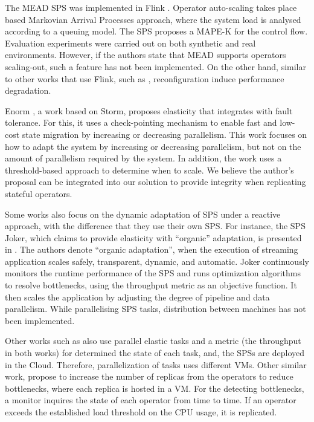 The MEAD SPS \cite{RussoCCP21} was implemented in Flink \cite{CarboneKEMHT15}. Operator auto-scaling takes place based  Markovian Arrival Processes approach, where the system load is analysed according to a queuing model. The SPS proposes a MAPE-K for the control flow. Evaluation experiments were carried out on both synthetic and real environments. However, if the authors state that MEAD supports operators scaling-out, such a feature has not been implemented. On the other hand, similar to other works that use Flink, such as \cite{arkian2021model}, reconfiguration induce performance degradation.

Enorm \citep{MadsenZS16}, a work based on Storm, proposes elasticity that integrates with fault tolerance. For this, it uses a check-pointing mechanism to enable fast and low-cost state migration by increasing or decreasing parallelism. This work focuses on how to adapt the system by increasing or decreasing parallelism, but not on the amount of parallelism required by the system. In addition, the work uses a threshold-based approach to determine when to scale. We believe the author's proposal can be integrated into our solution to provide integrity when replicating stateful operators.

Some works also focus on the dynamic adaptation of SPS under a reactive approach, with the difference that they use their own SPS. For instance, the SPS Joker, which claims to provide elasticity with ``organic'' adaptation, is presented in \cite{KahveciG20}. The authors denote ``organic adaptation'', when the execution of streaming application scales safely, transparent, dynamic, and automatic. Joker continuously monitors the runtime performance of the SPS and runs optimization algorithms to resolve bottlenecks, using the throughput metric as an objective function. It then scales the application by adjusting the degree of pipeline and data parallelism. While parallelising SPS tasks, distribution between machines has not been implemented.

Other works such as \citep{GedikSHW14, SchneiderAGBW09} also use parallel elastic tasks and a metric (the throughput in both works) for determined the state of each task, and, the SPSs are deployed in the {Cloud}. Therefore, parallelization of tasks uses different VMs. Other similar work, \citep{FernandezMKP13} propose to increase the number of replicas from the operators to reduce bottlenecks, where each replica is hosted in a VM. For the detecting bottlenecks, a monitor inquires the state of each operator from time to time. If an operator exceeds the established load threshold on the CPU usage, it is replicated.

